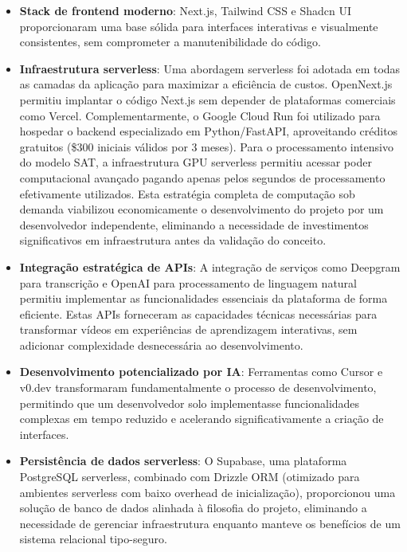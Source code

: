 \documentclass[tcc,capa]{texufpel}
\begin{document}
\begin{itemize}
    \item \textbf{Stack de frontend moderno}: Next.js, Tailwind CSS e Shadcn UI proporcionaram uma base sólida para interfaces interativas e visualmente consistentes, sem comprometer a manutenibilidade do código.
    
    \item \textbf{Infraestrutura serverless}: Uma abordagem serverless foi adotada em todas as camadas da aplicação para maximizar a eficiência de custos. OpenNext.js permitiu implantar o código Next.js sem depender de plataformas comerciais como Vercel. Complementarmente, o Google Cloud Run foi utilizado para hospedar o backend especializado em Python/FastAPI, aproveitando créditos gratuitos (\$300 iniciais válidos por 3 meses). Para o processamento intensivo do modelo SAT, a infraestrutura GPU serverless permitiu acessar poder computacional avançado pagando apenas pelos segundos de processamento efetivamente utilizados. Esta estratégia completa de computação sob demanda viabilizou economicamente o desenvolvimento do projeto por um desenvolvedor independente, eliminando a necessidade de investimentos significativos em infraestrutura antes da validação do conceito.
    
    \item \textbf{Integração estratégica de APIs}: A integração de serviços como Deepgram para transcrição e OpenAI para processamento de linguagem natural permitiu implementar as funcionalidades essenciais da plataforma de forma eficiente. Estas APIs forneceram as capacidades técnicas necessárias para transformar vídeos em experiências de aprendizagem interativas, sem adicionar complexidade desnecessária ao desenvolvimento.
    
    \item \textbf{Desenvolvimento potencializado por IA}: Ferramentas como Cursor e v0.dev transformaram fundamentalmente o processo de desenvolvimento, permitindo que um desenvolvedor solo implementasse funcionalidades complexas em tempo reduzido e acelerando significativamente a criação de interfaces.
    
   \item \textbf{Persistência de dados serverless}: O Supabase, uma plataforma PostgreSQL serverless, combinado com Drizzle ORM (otimizado para ambientes serverless com baixo overhead de inicialização), proporcionou uma solução de banco de dados alinhada à filosofia do projeto, eliminando a necessidade de gerenciar infraestrutura enquanto manteve os benefícios de um sistema relacional tipo-seguro.
\end{itemize}
\end{document}
